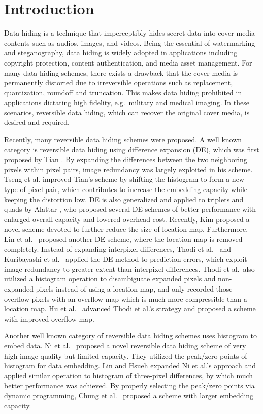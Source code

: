 \documentclass{sig-alternate}
\begin{document}
\section{Introduction}
Data hiding is a technique that imperceptibly hides secret data into cover media contents such as
audios, images, and videos. Being the essential of watermarking and steganography, data hiding is
widely adopted in applications including copyright protection, content authentication, and media
asset management. For many data hiding schemes, there exists a drawback that the cover media is
permanently distorted due to irreversible operations such as replacement, quantization, roundoff and
truncation. This makes data hiding prohibited in applications dictating high fidelity, e.g.\
military and medical imaging. In these scenarios, reversible data hiding, which can recover the
original cover media, is desired and required.

Recently, many reversible data hiding schemes were proposed. A well known category is reversible
data hiding using difference expansion (DE), which was first proposed by Tian \cite{Tian03de}. By
expanding the differences between the two neighboring pixels within pixel pairs, image redundancy
was largely exploited in his scheme. Tseng et al. \cite{Tseng08deextended} improved Tian's scheme by
shifting the histogram to form a new type of pixel pair, which contributes to increase the embedding
capacity while keeping the distortion low. DE is also generalized and applied to triplets and quads
by Alattar \cite{Alattar04deip}, who proposed several DE schemes of better performance with enlarged
overall capacity and lowered overhead cost. Recently, Kim \cite{Kim08ifs} proposed a novel scheme
devoted to further reduce the size of location map. Furthermore, Lin et al.\ \cite{Lin08} proposed
another DE scheme, where the location map is removed completely. Instead of expanding interpixel
differences, Thodi et al.\ \cite{Thodi07pee} and Kuribayashi et al.\ \cite{Kuribayashi08} applied
the DE method to prediction-errors, which exploit image redundancy to greater extent than interpixel
differences. Thodi et al.\ also utilized a histogram operation to disambiguate expanded pixels and
non-expanded pixels instead of using a location map, and only recorded those overflow pixels with an
overflow map which is much more compressible than a location map. Hu et al.\ \cite{Hu2009} advanced
Thodi et al.'s strategy and proposed a scheme with improved overflow map.

Another well known category of reversible data hiding schemes uses histogram to embed data. Ni et
al.\ \cite{Ni06hist} proposed a novel reversible data hiding scheme of very high image quality but
limited capacity. They utilized the peak/zero points of histogram for data embedding. Lin and Hsueh
\cite{Lin08tp} expanded Ni et al.'s approach and applied similar operation to histogram of
three-pixel differences, by which much better performance was achieved. By properly selecting the
peak/zero points via dynamic programming, Chung et al.\ \cite{Chung08dyna} proposed a scheme with
larger embedding capacity.
\end{document}
